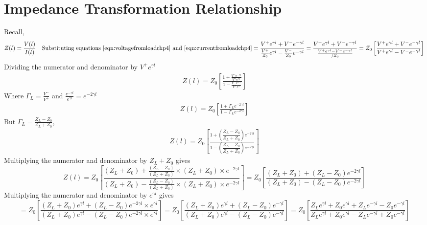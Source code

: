 \section{Impedance Transformation Relationship}
Recall,
\begin{dmath*}
Z(l) = \frac{V(l)}{I(l)}\quad\text{Substituting equations~\eqref{eqn:voltagefromloadchp4} and~\eqref{eqn:currentfromloadchp4}}
= \frac{V^+e^{\gamma l} + V^-e^{-\gamma l}}{\frac{V^+}{Z_0}e^{\gamma l} - \frac{V^-}{Z_0}e^{-\gamma l}}
= \frac{V^+e^{\gamma l} + V^-e^{-\gamma l}}{\frac{V^+e^{\gamma l} - V^-e^{-\gamma l}}{/Z_0}}
= Z_0\left[\frac{V^+e^{\gamma l} + V^-e^{-\gamma l}}{V^+e^{\gamma l} - V^-e^{-\gamma l}}\right]
\end{dmath*}
Dividing the numerator and denominator by $V^+e^{\gamma l}$ 
\begin{align*}
Z(l) = Z_0\left[\frac{1 + \frac{V^-e^{-\gamma l}}{V^+e^{\gamma l}}}{1 - \frac{V^-e^{-\gamma }}{V^+e^{\gamma }}}\right]
\end{align*}
Where $\Gamma_L = \frac{V^-}{V^+}$ and $\frac{e^{-\gamma l}}{e^{\gamma l}} = e^{-2\gamma l}$
\begin{align}
Z(l)= Z_0\left[\frac{1 + \Gamma_L e^{-2\gamma l}}{1 - \Gamma_L e^{-2\gamma l}}\right]
\end{align}
But $\Gamma_L
= \frac{Z_L - Z_0}{Z_L + Z_0}$,
\begin{align*}
Z(l) = Z_0 \left[\frac{1 + \left(\dfrac{Z_L - Z_0}{Z_L + Z_0}\right)e^{-2\gamma l}}{1 - \left(\dfrac{Z_L - Z_0}{Z_L + Z_0}\right)e^{-2\gamma l}}\right]
\end{align*}
Multiplying the numerator and denominator by $Z_L + Z_0 $ gives
\begin{dmath*}
Z(l) = Z_0 \left[\frac{(Z_L + Z_0) + \frac{(Z_L - Z_0)}{(Z_L + Z_0)} \times (Z_L + Z_0) \times e^{-2\gamma l}}{(Z_L + Z_0) - \frac{(Z_L - Z_0)}{(Z_L + Z_0)} \times (Z_L + Z_0) \times e^{-2\gamma l}}\right]
= Z_0 \left[\frac{(Z_L + Z_0) + (Z_L - Z_0)e^{-2\gamma l}}{(Z_L + Z_0) - (Z_L - Z_0)e^{-2\gamma l}}\right]
\end{dmath*}
Multiplying the numerator and denominator by $e^{\gamma l}$ gives
\begin{dmath*}
= Z_0 \left[\frac{(Z_L + Z_0)e^{\gamma l} + (Z_L - Z_0)e^{-2\gamma l} \times e^{\gamma l}}{(Z_L + Z_0)e^{\gamma l} - (Z_L - Z_0)e^{-2\gamma l} \times e^{\gamma l}}\right]
= Z_0 \left[\frac{(Z_L + Z_0)e^{\gamma l} + (Z_L - Z_0)e^{-\gamma l}}{(Z_L + Z_0)e^{\gamma l} - (Z_L - Z_0)e^{-\gamma l}}\right]
= Z_0 \left[\frac{Z_L e^{\gamma l} + Z_0e^{\gamma l} + Z_L e^{-\gamma l} - Z_0e^{-\gamma l}}{Z_L e^{\gamma l} + Z_0e^{\gamma l} - Z_L e^{-\gamma l} + Z_0e^{-\gamma l}}\right]
\end{dmath*}
